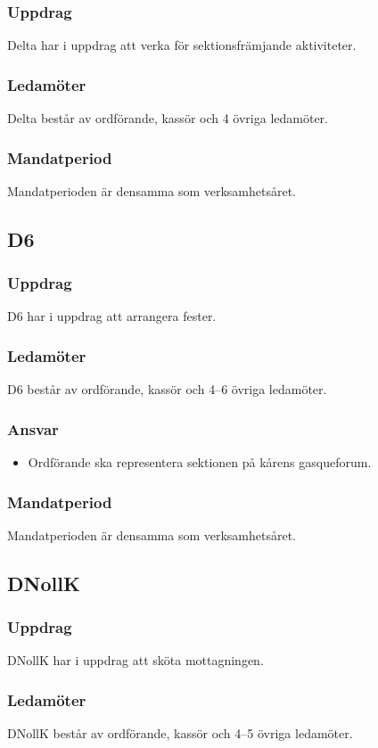 \subsubsection{Uppdrag}
Delta har i uppdrag att verka för sektionsfrämjande aktiviteter. 
\subsubsection{Ledamöter}
Delta består av ordförande, kassör och 4 övriga ledamöter.
\subsubsection{Mandatperiod}
Mandatperioden är densamma som verksamhetsåret. 

\subsection{D6}
\subsubsection{Uppdrag}
D6 har i uppdrag att arrangera fester. 
\subsubsection{Ledamöter}
D6 består av ordförande, kassör och 4--6 övriga ledamöter.
\subsubsection{Ansvar}
\begin{itemize}
    \item Ordförande ska representera sektionen på kårens gasqueforum.
\end{itemize}
\subsubsection{Mandatperiod}
Mandatperioden är densamma som verksamhetsåret. 

\subsection{DNollK}
\subsubsection{Uppdrag}
DNollK har i uppdrag att sköta mottagningen. 
\subsubsection{Ledamöter}
DNollK består av ordförande, kassör och 4--5 övriga ledamöter.

